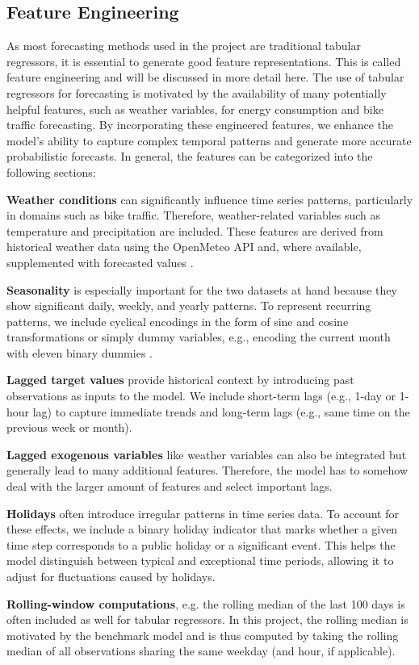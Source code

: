 \subsection{Feature Engineering}
\label{sec:Methodology:FeatureEngineering}

As most forecasting methods used in the project are traditional tabular regressors, 
it is essential to generate good feature representations. 
This is called feature engineering and will be discussed in more detail here.
The use of tabular regressors for forecasting is motivated by the availability of many potentially helpful features, such as weather variables, for energy consumption and bike traffic forecasting.
By incorporating these engineered features, we enhance the model's ability to 
capture complex temporal patterns and generate more accurate probabilistic forecasts.
In general, the features can be categorized into the following sections:

\textbf{Weather conditions} can significantly influence time series patterns, particularly in domains such as bike traffic. Therefore, weather-related variables such as temperature and precipitation are included. These features are derived from historical weather data using the OpenMeteo API and, where available, supplemented with forecasted values  \parencite{zippenfenig_open-meteocom_2024}.

\textbf{Seasonality} is especially important for the two datasets at hand because they show significant daily, weekly, and yearly patterns. To represent recurring patterns, we include cyclical encodings in the form of sine and cosine transformations or simply dummy variables, e.g., encoding the current month with eleven binary dummies \parencite[Chapter~7.4]{hyndman_forecasting_2021}.

\textbf{Lagged target values} provide historical context by introducing past observations as inputs to the model. We include short-term lags (e.g., 1-day or 1-hour lag) to capture immediate trends and long-term lags (e.g., same time on the previous week or month).

\textbf{Lagged exogenous variables} like weather variables can also be integrated but generally lead to many additional features. Therefore, the model has to somehow deal with the larger amount of features and select important lags.

\textbf{Holidays} often introduce irregular patterns in time series data. To account for these effects, we include a binary holiday indicator that marks whether a given time step corresponds to a public holiday or a significant event. This helps the model distinguish between typical and exceptional time periods, allowing it to adjust for fluctuations caused by holidays.

\textbf{Rolling-window computations}, e.g. the rolling median of the last 100 days is often included as well for tabular regressors. In this project, the rolling median is motivated by the benchmark model and is thus computed by taking the rolling median of all observations sharing the same weekday (and hour, if applicable).



